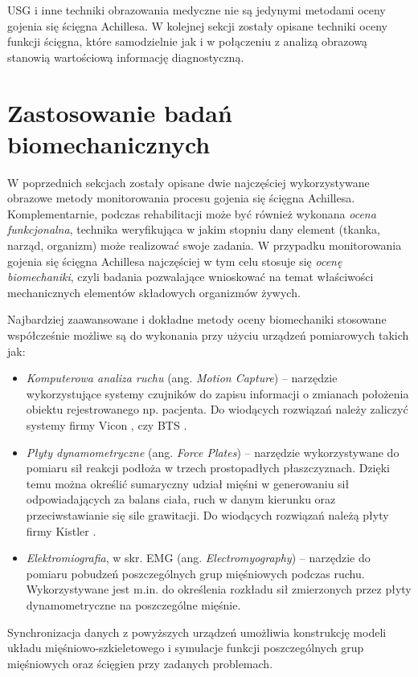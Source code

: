 USG i inne techniki obrazowania medyczne nie są jedynymi metodami oceny gojenia się ścięgna Achillesa. W kolejnej sekcji zostały opisane techniki oceny funkcji ścięgna, które samodzielnie jak i w połączeniu z analizą obrazową stanowią wartościową informację diagnostyczną.

\section{Zastosowanie badań biomechanicznych}
\label{biomechanika}
W poprzednich sekcjach zostały opisane dwie najczęściej wykorzystywane obrazowe metody monitorowania procesu gojenia się ścięgna Achillesa. Komplementarnie, podczas rehabilitacji może być również wykonana \textit{ocena funkcjonalna}, technika weryfikująca w jakim stopniu dany element (tkanka, narząd, organizm) może realizować swoje zadania. W przypadku monitorowania gojenia się ścięgna Achillesa najczęściej w tym celu stosuje się \textit{ocenę biomechaniki}, czyli badania pozwalające wnioskować na temat właściwości mechanicznych elementów składowych organizmów żywych. 

Najbardziej zaawansowane i dokładne metody oceny biomechaniki stosowane współcześnie możliwe są do wykonania przy użyciu urządzeń pomiarowych takich jak:
\begin{itemize}
	\item \textit{Komputerowa analiza ruchu} (ang. \textit{Motion Capture}) -- narzędzie wykorzystujące systemy czujników do zapisu informacji o zmianach położenia obiektu rejestrowanego np. pacjenta. Do wiodących rozwiązań należy zaliczyć systemy firmy Vicon \cite{Vicon}, czy BTS \cite{BTS}.
	\item \textit{Płyty dynamometryczne} (ang. \textit{Force Plates}) -- narzędzie wykorzystywane do pomiaru sił reakcji podłoża w trzech prostopadłych płaszczyznach. Dzięki temu można określić sumaryczny udział mięśni w generowaniu sił odpowiadających za balans ciała, ruch w danym kierunku oraz przeciwstawianie się sile grawitacji. Do wiodących rozwiązań należą płyty firmy Kistler \cite{KISTLER}.
	\item \textit{Elektromiografia}, w skr. EMG (ang. \textit{Electromyography}) -- narzędzie do pomiaru pobudzeń poszczególnych grup mięśniowych podczas ruchu. Wykorzystywane jest m.in. do określenia rozkładu sił zmierzonych przez płyty dynamometryczne na poszczególne mięśnie.
\end{itemize}

Synchronizacja danych z powyższych urządzeń umożliwia konstrukcję modeli układu mięśniowo-szkieletowego i symulacje funkcji poszczególnych grup mięśniowych oraz ścięgien przy zadanych problemach.

